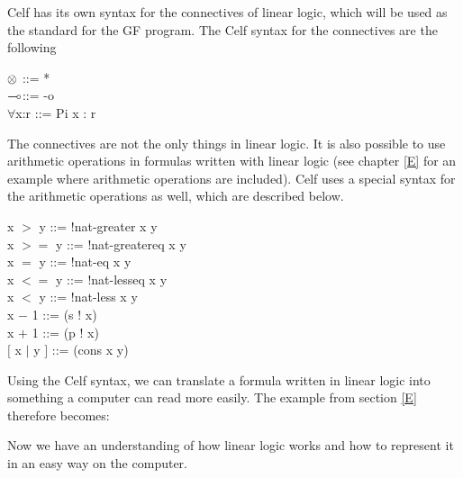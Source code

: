 Celf has its own syntax for the connectives of linear logic, which will be used as the standard for the GF program. The Celf syntax for the connectives are the following
\begin{texto}
	$\otimes$\hspace{40pt} ::= * \\
	$\multimap$\hspace{40pt}::= -o \\
	$\forall$x:r\hspace{30pt} ::= Pi x : r \\
\end{texto}
The connectives are not the only things in linear logic. It is also possible to use arithmetic operations in formulas written with linear logic (see chapter \ref{E} for an example where arithmetic operations are included). Celf uses a special syntax for the arithmetic operations as well, which are described below.
\begin{texto}
	x $>$ y\hspace{22.8pt} ::= !nat-greater x y \\
	x $>=$ y\hspace{15pt} ::= !nat-greatereq x y \\
	x $=$ y\hspace{22.8pt} ::= !nat-eq x y \\
	x $<=$ y\hspace{15pt} ::= !nat-lesseq x y \\
	x $<$ y\hspace{22.8pt} ::= !nat-less x y \\
 	x $-$ 1\hspace{22.8pt} ::= (s ! x) \\
 	x $+$ 1\hspace{22.8pt} ::= (p ! x) \\
	$\lbrack$ x $|$ y $\rbrack$ \hspace{12pt} ::= (cons x y)
\end{texto}
Using the Celf syntax, we can translate a formula written in linear logic into something a computer can read more easily. The example from section \ref{E} therefore becomes:
\begin{texto}
\end{texto}

Now we have an understanding of how linear logic works and how to represent it in an easy way on the computer. \\
 \\

